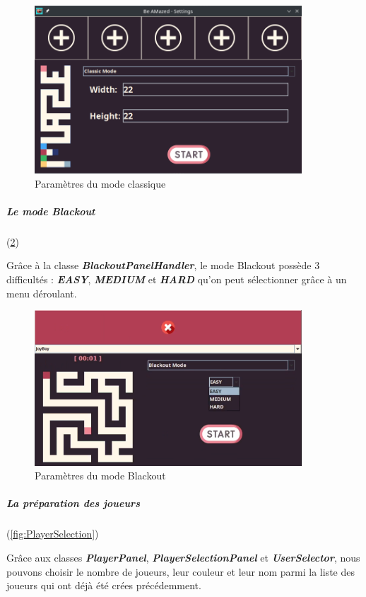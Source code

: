 \begin{figure}[h!]
    \centering
    \includegraphics[width=10cm]{ressources/Implementation/Labyrinthe/Controleur/SettingsMenu_ClassicMode.png}
    \caption{Paramètres du mode classique}
    \label{fig:ClassicMode}
\end{figure}
\FloatBarrier

\subparagraph*{Le mode Blackout} (\ref{fig:BlackoutModeDifficulty})

Grâce à la classe \textbf{\textit{BlackoutPanelHandler}}, le mode Blackout possède 3 difficultés : \textbf{\textit{EASY}}, \textbf{\textit{MEDIUM}} et \textbf{\textit{HARD}} qu'on peut sélectionner grâce à un menu déroulant.

\begin{figure}[h!]
    \centering
    \includegraphics[width=10cm]{ressources/Implementation/Labyrinthe/Controleur/SettingsMenu_BlackoutMode_Difficulty.png}
    \caption{Paramètres du mode Blackout}
    \label{fig:BlackoutModeDifficulty}
\end{figure}
\FloatBarrier

\newpage

\subparagraph*{La préparation des joueurs} (\ref{fig:PlayerSelection})

Grâce aux classes \textbf{\textit{PlayerPanel}}, \textbf{\textit{PlayerSelectionPanel}} et \textbf{\textit{UserSelector}}, nous pouvons choisir le nombre de joueurs, leur couleur et leur nom parmi la liste des joueurs qui ont déjà été crées précédemment.

